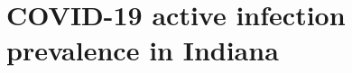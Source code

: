 \documentclass[11pt]{amsart}
\numberwithin{equation}{section}
\theoremstyle{plain}
\begin{document}
\section{COVID-19 active infection prevalence in Indiana}
\label{section:applications}

\end{document}
